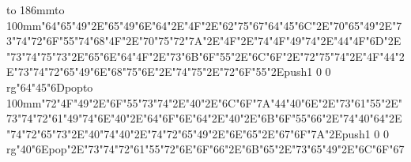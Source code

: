 \hbox to 186mm{\hsize=81mm\vbox to 100mm{\vfill\ipa\char"64\ipa\char"65\ipa\char"49\ipa\char"2E\ipa\char"65\ipa\char"49\ipa\char"6E\ipa\char"64\ipa\char"2E\ipa\char"4F\ipa\char"2E\ipa\char"62\ipa\char"75\ipa\char"67\medskip\ipa\char"64\ipa\char"45\ipa\char"6C\ipa\char"2E\ipa\char"70\ipa\char"65\ipa\char"49\ipa\char"2E\ipa\char"73\ipa\char"74\ipa\char"72\ipa\char"6F\ipa\char"55\ipa\char"74\medskip\ipa\char"68\ipa\char"4F\ipa\char"2E\ipa\char"70\ipa\char"75\ipa\char"72\ipa\char"7A\ipa\char"2E\ipa\char"4F\ipa\char"2E\ipa\char"74\ipa\char"4F\ipa\char"49\ipa\char"74\ipa\char"2E\ipa\char"44\ipa\char"4F\ipa\char"6D\ipa\char"2E\ipa\char"73\ipa\char"74\ipa\char"75\ipa\char"73\ipa\char"2E\ipa\char"65\ipa\char"6E\ipa\char"64\medskip\ipa\char"4F\ipa\char"2E\ipa\char"73\ipa\char"6B\ipa\char"6F\ipa\char"55\ipa\char"2E\ipa\char"6C\ipa\char"6F\ipa\char"2E\ipa\char"72\ipa\char"75\ipa\char"74\ipa\char"2E\ipa\char"4F\ipa\char"44\ipa\char"2E\ipa\char"73\ipa\char"74\ipa\char"72\ipa\char"65\ipa\char"49\ipa\char"6E\medskip\ipa\char"68\ipa\char"75\ipa\char"6E\ipa\char"2E\ipa\char"74\ipa\char"75\ipa\char"2E\ipa\char"72\ipa\char"6F\ipa\char"55\ipa\char"2E\pdfcolorstack\match push{1 0 0 rg}\ipa\char"64\ipa\char"45\ipa\char"6D\pdfcolorstack\match pop{}\vfill}\hfill\vbox to 100mm{\vfill\ipa\char"72\ipa\char"4F\ipa\char"49\ipa\char"2E\ipa\char"6F\ipa\char"55\ipa\char"73\ipa\char"74\ipa\char"2E\ipa\char"40\ipa\char"2E\ipa\char"6C\ipa\char"6F\ipa\char"7A\medskip\ipa\char"44\ipa\char"40\ipa\char"6E\ipa\char"2E\ipa\char"73\ipa\char"61\ipa\char"55\ipa\char"2E\ipa\char"73\ipa\char"74\ipa\char"72\ipa\char"61\ipa\char"49\ipa\char"74\medskip\ipa\char"6E\ipa\char"40\ipa\char"2E\ipa\char"64\ipa\char"6F\ipa\char"6E\ipa\char"64\ipa\char"2E\ipa\char"40\ipa\char"2E\ipa\char"6B\ipa\char"6F\ipa\char"55\ipa\char"66\ipa\char"2E\ipa\char"74\ipa\char"40\ipa\char"64\ipa\char"2E\ipa\char"74\ipa\char"72\ipa\char"65\ipa\char"73\ipa\char"2E\ipa\char"40\ipa\char"74\medskip\ipa\char"40\ipa\char"2E\ipa\char"74\ipa\char"72\ipa\char"65\ipa\char"49\ipa\char"2E\ipa\char"6E\ipa\char"65\ipa\char"2E\ipa\char"67\ipa\char"6F\ipa\char"7A\ipa\char"2E\pdfcolorstack\match push{1 0 0 rg}\ipa\char"40\ipa\char"6E\pdfcolorstack\match pop{}\ipa\char"2E\ipa\char"73\ipa\char"74\ipa\char"72\ipa\char"61\ipa\char"55\ipa\char"72\medskip\ipa\char"6E\ipa\char"6F\ipa\char"66\ipa\char"2E\ipa\char"6B\ipa\char"65\ipa\char"2E\ipa\char"73\ipa\char"65\ipa\char"49\ipa\char"2E\ipa\char"6C\ipa\char"6F\ipa\char"67\vfill}}\eject
